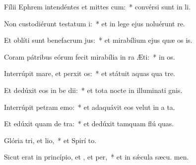 \item Fílii Ephrem intendéntes et mittes cum:~* convérsi sunt in  li.
\item Non custodiérunt testatum i:~* et in lege ejus noluérunt re.
\item Et oblíti sunt benefacrum jus:~* et mirabílium ejus quæ os is.
\item Coram pátribus eórum fecit mirabília in ra Æti:~* in  os.
\item Interrúpit mare, et perxit os:~* et státuit aquas qua  tre.
\item Et dedúxit eos in be dii:~* et tota nocte in illuminati gnis.
\item Interrúpit petram  emo:~* et adaquávit eos velut in a ta.
\item Et edúxit quam de tra:~* et dedúxit tamquam flú quas.
\item Glória tri, et lio,~* et Spirí to.
\item Sicut erat in princípio, et , et per,~* et in sǽcula sæcu. men.

